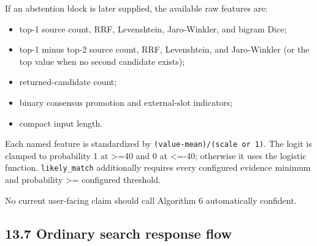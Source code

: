 If an abstention block is later supplied, the available raw features are:

\begin{itemize}
\tightlist
\item
  top-1 source count, RRF, Levenshtein, Jaro-Winkler, and bigram Dice;
\item
  top-1 minus top-2 source count, RRF, Levenshtein, and Jaro-Winkler (or the top value when no second candidate exists);
\item
  returned-candidate count;
\item
  binary consensus promotion and external-slot indicators;
\item
  compact input length.
\end{itemize}

Each named feature is standardized by \texttt{(value-mean)/(scale\ or\ 1)}. The logit is clamped to probability 1 at \textgreater=40 and 0 at \textless=-40; otherwise it uses the logistic function. \texttt{likely\_\allowbreak{}match} additionally requires every configured evidence minimum and probability \textgreater= configured threshold.

No current user-facing claim should call Algorithm 6 automatically confident.

\subsection{13.7 Ordinary search response flow}\label{137-ordinary-search-response-flow}

